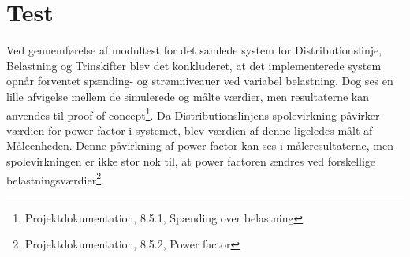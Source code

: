 
\section{Test}

Ved gennemførelse af modultest for det samlede system for Distributionslinje, Belastning og Trinskifter blev det konkluderet, at det implementerede system opnår forventet spænding- og strømniveauer ved variabel belastning. Dog ses en lille afvigelse mellem de simulerede og målte værdier, men resultaterne kan anvendes til proof of concept\footnote{Projektdokumentation, 8.5.1, Spænding over belastning}. Da Distributionslinjens spolevirkning påvirker værdien for power factor i systemet, blev værdien af denne ligeledes målt af Måleenheden. Denne påvirkning af power factor kan ses i måleresultaterne, men spolevirkningen er ikke stor nok til, at power factoren ændres ved forskellige belastningsværdier\footnote{Projektdokumentation, 8.5.2, Power factor}. 
